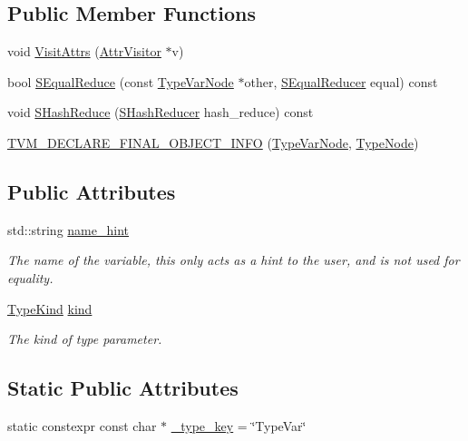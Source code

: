 \subsection*{Public Member Functions}
\begin{DoxyCompactItemize}
\item 
void \hyperlink{classtvm_1_1TypeVarNode_a1ff00c9482ca9e0366e40237180189c7}{Visit\+Attrs} (\hyperlink{classtvm_1_1AttrVisitor}{Attr\+Visitor} $\ast$v)
\item 
bool \hyperlink{classtvm_1_1TypeVarNode_aa705547c1fd4e702d2d9f295ce609605}{S\+Equal\+Reduce} (const \hyperlink{classtvm_1_1TypeVarNode}{Type\+Var\+Node} $\ast$other, \hyperlink{classtvm_1_1SEqualReducer}{S\+Equal\+Reducer} equal) const 
\item 
void \hyperlink{classtvm_1_1TypeVarNode_a301a22d01b973716f47a13a29119cfd9}{S\+Hash\+Reduce} (\hyperlink{classtvm_1_1SHashReducer}{S\+Hash\+Reducer} hash\+\_\+reduce) const 
\item 
\hyperlink{classtvm_1_1TypeVarNode_a7c32797e2abcdf3a1278d4f9973eb192}{T\+V\+M\+\_\+\+D\+E\+C\+L\+A\+R\+E\+\_\+\+F\+I\+N\+A\+L\+\_\+\+O\+B\+J\+E\+C\+T\+\_\+\+I\+N\+FO} (\hyperlink{classtvm_1_1TypeVarNode}{Type\+Var\+Node}, \hyperlink{classtvm_1_1TypeNode}{Type\+Node})
\end{DoxyCompactItemize}
\subsection*{Public Attributes}
\begin{DoxyCompactItemize}
\item 
std\+::string \hyperlink{classtvm_1_1TypeVarNode_a417cf13dd23ee15ac8d1fb274fff46eb}{name\+\_\+hint}
\begin{DoxyCompactList}\small\item\em The name of the variable, this only acts as a hint to the user, and is not used for equality. \end{DoxyCompactList}\item 
\hyperlink{namespacetvm_acd267f8d7f55da6ac681239831963279}{Type\+Kind} \hyperlink{classtvm_1_1TypeVarNode_afc08e151afef3c4644ba8d2cd796106a}{kind}
\begin{DoxyCompactList}\small\item\em The kind of type parameter. \end{DoxyCompactList}\end{DoxyCompactItemize}
\subsection*{Static Public Attributes}
\begin{DoxyCompactItemize}
\item 
static constexpr const char $\ast$ \hyperlink{classtvm_1_1TypeVarNode_acee77b1f71e1ecda9212a47d123e2c06}{\+\_\+type\+\_\+key} = \char`\"{}Type\+Var\char`\"{}
\end{DoxyCompactItemize}


